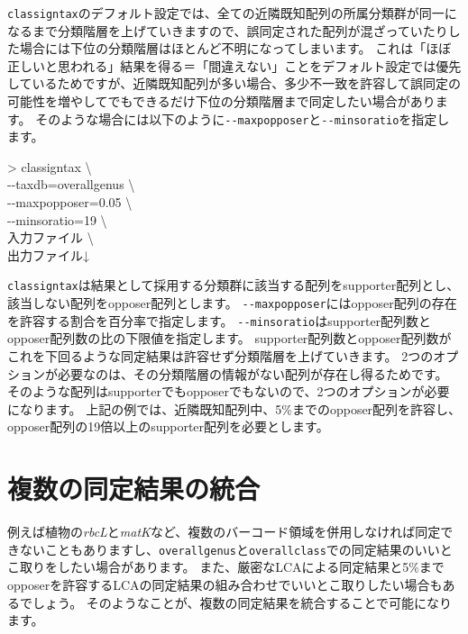\documentclass[titlepage,10pt,a4paper]{jsbook}
\newenvironment{cmd}{\begin{oframed}\raggedright\ttfamily\footnotesize\setlength{\baselineskip}{1.4em}}{\end{oframed}\vspace{-1em}}
\begin{document}
\texttt{classigntax}のデフォルト設定では、全ての近隣既知配列の所属分類群が同一になるまで分類階層を上げていきますので、誤同定された配列が混ざっていたりした場合には下位の分類階層はほとんど不明になってしまいます。
これは「ほぼ正しいと思われる」結果を得る＝「間違えない」ことをデフォルト設定では優先しているためですが、近隣既知配列が多い場合、多少不一致を許容して誤同定の可能性を増やしてでもできるだけ下位の分類階層まで同定したい場合があります。
そのような場合には以下のように\texttt{{-}{-}maxpopposer}と\texttt{{-}{-}minsoratio}を指定します。
\begin{cmd}
{\textgreater} classigntax {\textbackslash}\\
{-}{-}taxdb=overall{\textunderscore}genus {\textbackslash}\\
{-}{-}maxpopposer=0.05 {\textbackslash}\\
{-}{-}minsoratio=19 {\textbackslash}\\
入力ファイル {\textbackslash}\\
出力ファイル↓
\end{cmd}
\texttt{classigntax}は結果として採用する分類群に該当する配列をsupporter配列とし、該当しない配列をopposer配列とします。
\texttt{{-}{-}maxpopposer}にはopposer配列の存在を許容する割合を百分率で指定します。
\texttt{{-}{-}minsoratio}はsupporter配列数とopposer配列数の比の下限値を指定します。
supporter配列数とopposer配列数がこれを下回るような同定結果は許容せず分類階層を上げていきます。
2つのオプションが必要なのは、その分類階層の情報がない配列が存在し得るためです。
そのような配列はsupporterでもopposerでもないので、2つのオプションが必要になります。
上記の例では、近隣既知配列中、5\%までのopposer配列を許容し、opposer配列の19倍以上のsupporter配列を必要とします。

\section{複数の同定結果の統合}\label{section:mergingmultipleassignment}

例えば植物の\textit{rbcL}と\textit{matK}など、複数のバーコード領域を併用しなければ同定できないこともありますし、\texttt{overall{\textunderscore}genus}と\texttt{overall{\textunderscore}class}での同定結果のいいとこ取りをしたい場合があります。
また、厳密なLCAによる同定結果と5\%までopposerを許容するLCAの同定結果の組み合わせでいいとこ取りしたい場合もあるでしょう。
そのようなことが、複数の同定結果を統合することで可能になります。
\end{document}
